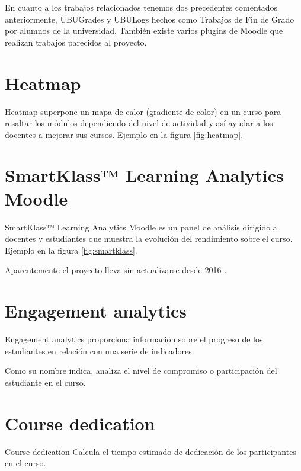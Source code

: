 
En cuanto a los trabajos relacionados tenemos dos precedentes comentados anteriormente, UBUGrades y UBULogs hechos como Trabajos de Fin de Grado por alumnos de la universidad. También existe varios plugins de Moodle que realizan trabajos parecidos al proyecto.


\section{Heatmap}

Heatmap \cite{noauthor_moodle_nodate-2} superpone un mapa de calor (gradiente de color) en un curso para resaltar los módulos dependiendo del nivel de actividad y así ayudar a los docentes a mejorar sus cursos. Ejemplo en la figura \ref{fig:heatmap}.


\section{SmartKlass™ Learning Analytics Moodle}
SmartKlass™ Learning Analytics Moodle \cite{noauthor_moodle_nodate-3} es un panel de análisis dirigido a docentes y estudiantes que muestra la evolución del rendimiento sobre el curso. Ejemplo en la figura \ref{fig:smartklass}.

Aparentemente el proyecto lleva sin actualizarse desde 2016 \cite{noauthor_klassdata/moodle-local_smart_klass:_nodate}.


\section{Engagement analytics}

Engagement analytics \cite{noauthor_moodle_nodate-4} proporciona información sobre el progreso de los estudiantes en relación con una serie de indicadores.

Como su nombre indica, analiza el nivel de compromiso o participación del estudiante en el curso.

\section{Course dedication}

Course dedication \cite{noauthor_moodle_nodate-5} Calcula el tiempo estimado de dedicación de los participantes en el curso.



